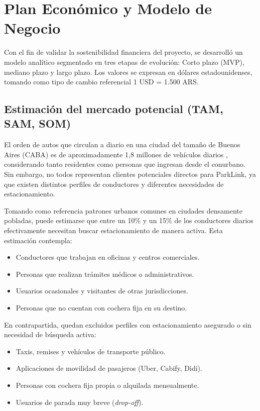 \section{Plan Económico y Modelo de Negocio}\label{sec:plan_economico}

Con el fin de validar la sostenibilidad financiera del proyecto, se desarrolló un modelo analítico segmentado en tres etapas de evolución: Corto plazo (MVP), mediano plazo y largo plazo. Los valores se expresan en dólares estadounidenses, tomando como tipo de cambio referencial 1 USD = 1.500 ARS.

\subsection{Estimación del mercado potencial (TAM, SAM, SOM)}

El orden de autos que circulan a diario en una ciudad del tamaño de Buenos Aires (CABA) es de aproximadamente 1,8 millones de vehículos diarios \autocite{superauto2024, aboy2025movilidad}, considerando tanto residentes como personas que ingresan desde el conurbano. Sin embargo, no todos representan clientes potenciales directos para ParkLink, ya que existen distintos perfiles de conductores y diferentes necesidades de estacionamiento.

Tomando como referencia patrones urbanos comunes en ciudades densamente pobladas, puede estimarse que entre un 10\% y un 15\% de los conductores diarios efectivamente necesitan buscar estacionamiento de manera activa. Esta estimación contempla:

\begin{itemize}
    \item Conductores que trabajan en oficinas y centros comerciales.
    \item Personas que realizan trámites médicos o administrativos.
    \item Usuarios ocasionales y visitantes de otras jurisdicciones.
    \item Personas que no cuentan con cochera fija en su destino.
\end{itemize}

En contrapartida, quedan excluidos perfiles con estacionamiento asegurado o sin necesidad de búsqueda activa:
\begin{itemize}
    \item Taxis, remises y vehículos de transporte público.
    \item Aplicaciones de movilidad de pasajeros (Uber, Cabify, Didi).
    \item Personas con cochera fija propia o alquilada mensualmente.
    \item Usuarios de parada muy breve (\textit{drop-off}).
\end{itemize}

